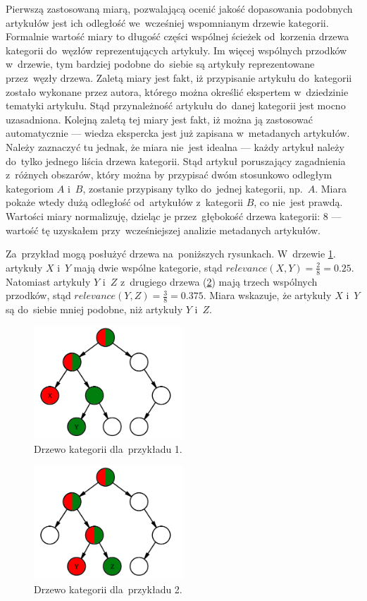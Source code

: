 \documentclass[pl]{minipw} %
\begin{document}
Pierwszą zastosowaną miarą, pozwalającą ocenić jakość dopasowania podobnych artykułów jest ich odległość we~wcześniej wspomnianym drzewie kategorii. Formalnie wartość miary to długość części wspólnej ścieżek od~korzenia drzewa kategorii do~węzłów reprezentujących artykuły. Im więcej wspólnych przodków w~drzewie, tym bardziej podobne do~siebie są artykuły reprezentowane przez~węzły drzewa. Zaletą miary jest fakt, iż przypisanie artykułu do~kategorii zostało wykonane przez autora, którego można określić ekspertem w~dziedzinie tematyki artykułu. Stąd przynależność artykułu do~danej kategorii jest mocno uzasadniona. Kolejną zaletą tej miary jest fakt, iż można ją zastosować automatycznie --- wiedza ekspercka jest już zapisana w~metadanych artykułów. Należy zaznaczyć tu jednak, że miara nie~jest idealna --- każdy artykuł należy do~tylko jednego liścia drzewa kategorii. Stąd artykuł poruszający zagadnienia z~różnych obszarów, który można by przypisać dwóm stosunkowo odległym kategoriom $A$ i~$B$, zostanie przypisany tylko do~jednej kategorii, np.~$A$. Miara pokaże wtedy dużą odległość od~artykułów z~kategorii $B$, co nie~jest prawdą. Wartości miary normalizuję, dzieląc je przez~głębokość drzewa kategorii: $8$ --- wartość tę uzyskałem przy~wcześniejszej analizie metadanych artykułów.

Za~przykład mogą posłużyć drzewa na~poniższych rysunkach. W~drzewie \ref{fig:tree1}. artykuły $X$ i~$Y$ mają dwie wspólne kategorie, stąd $relevance(X, Y) = \frac{2}{8} = 0.25$. Natomiast artykuły $Y$ i~$Z$ z~drugiego drzewa (\ref{fig:tree2}) mają trzech wspólnych przodków, stąd $relevance(Y, Z)=\frac{3}{8} = 0.375$. Miara wskazuje, że artykuły $X$ i~$Y$ są do~siebie mniej podobne, niż artykuły $Y$ i~$Z$.

\begin{figure}[H]
	\centering
	\includegraphics[width=0.5\textwidth]{img/cat_tree_example_1.png}
	\caption{Drzewo kategorii dla~przykładu 1.}
	\label{fig:tree1}
\end{figure}
\begin{figure}[H]
	\centering
	\includegraphics[width=0.5\textwidth]{img/cat_tree_example_2.png}
	\caption{Drzewo kategorii dla~przykładu 2.}
	\label{fig:tree2}
\end{figure}
\end{document}
